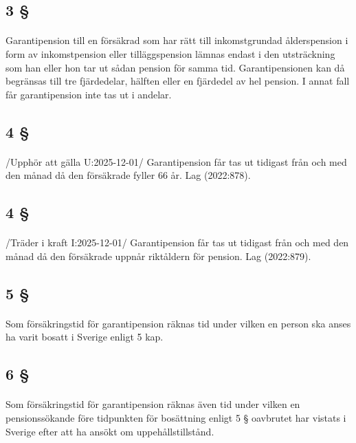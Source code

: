 \documentclass[a4paper,notitlepage,openany,10pt]{book}
\begin{document}
\subsection*{3 §}
\paragraph*{}
Garantipension till en försäkrad som har rätt till inkomstgrundad ålderspension i form av inkomstpension eller tilläggspension lämnas endast i den utsträckning som han eller hon tar ut sådan pension för samma tid.
Garantipensionen kan då begränsas till tre fjärdedelar, hälften eller en fjärdedel av hel pension. I annat fall får garantipension inte tas ut i andelar.
\subsection*{4 §}
\paragraph*{}
/Upphör att gälla U:2025-12-01/
Garantipension får tas ut tidigast från och med den månad då den försäkrade fyller 66 år.
Lag (2022:878).
\subsection*{4 §}
\paragraph*{}
/Träder i kraft I:2025-12-01/
Garantipension får tas ut tidigast från och med den månad då den försäkrade uppnår riktåldern för pension.
Lag (2022:879).
\subsection*{5 §}
\paragraph*{}
Som försäkringstid för garantipension räknas tid under vilken en person ska anses ha varit bosatt i Sverige enligt 5 kap.
\subsection*{6 §}
\paragraph*{}
Som försäkringstid för garantipension räknas även tid under vilken en pensionssökande före tidpunkten för bosättning enligt 5 § oavbrutet har vistats i Sverige efter att ha ansökt om uppehållstillstånd.
\end{document}
